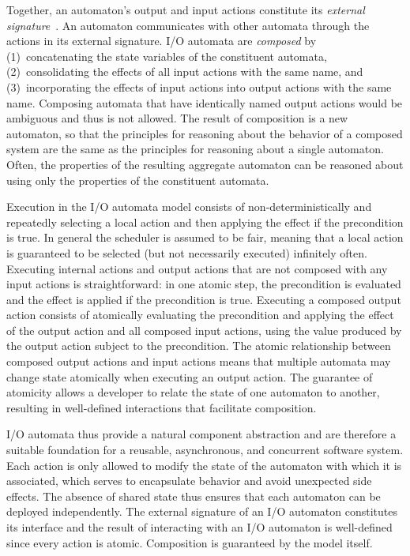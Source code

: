 Together, an automaton's output and input actions constitute its \emph{external signature}~\cite{lynch1996distributed}.
An automaton communicates with other automata through the actions in its external signature.
I/O automata are \emph{composed} by (1)~concatenating the state variables of the constituent automata, (2)~consolidating the effects of all input actions with the same name, and (3)~incorporating the effects of input actions into output actions with the same name.
Composing automata that have identically named output actions would be ambiguous and thus is not allowed.
The result of composition is a new automaton, so that the principles for reasoning about the behavior of a composed system are the same as the principles for reasoning about a single automaton.
Often, the properties of the resulting aggregate automaton can be reasoned about using only the properties of the constituent automata.

Execution in the I/O automata model consists of non-deterministically and repeatedly selecting a local action and then applying the effect if the precondition is true.
In general the scheduler is assumed to be fair, meaning that a local action is guaranteed to be selected (but not necessarily executed) infinitely often.
Executing internal actions and output actions that are not composed with any input actions is straightforward: in one atomic step, the precondition is evaluated and the effect is applied if the precondition is true.
Executing a composed output action consists of atomically evaluating the precondition and applying the effect of the output action and all composed input actions, using the value produced by the output action subject to the precondition.
The atomic relationship between composed output actions and input actions means that multiple automata may change state atomically when executing an output action.
The guarantee of atomicity allows a developer to relate the state of one automaton to another, resulting in well-defined interactions that facilitate composition.

I/O automata thus provide a natural component abstraction and are therefore a suitable foundation for a reusable, asynchronous, and concurrent software system.
Each action is only allowed to modify the state of the automaton with which it is associated, which serves to encapsulate behavior and avoid unexpected side effects.
The absence of shared state thus ensures that each automaton can be deployed independently.
The external signature of an I/O automaton constitutes its interface and the result of interacting with an I/O automaton is well-defined since every action is atomic.
Composition is guaranteed by the model itself.


